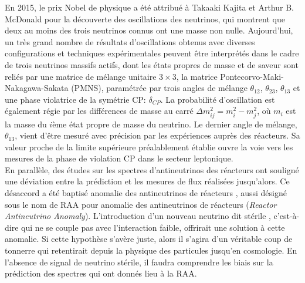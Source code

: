 En 2015, le prix Nobel de physique a été attribué à Takaaki Kajita et Arthur B. McDonald pour la découverte des oscillations des neutrinos, qui montrent que deux au moins des trois neutrinos connus ont une masse non nulle. Aujourd'hui, un très grand nombre de résultats d'oscillations obtenus avec diverses configurations et techniques expérimentales peuvent être interprétés dans le cadre de trois neutrinos massifs actifs, dont les états propres de masse et de saveur sont reliés par une matrice de mélange unitaire $3\times 3$, la matrice Pontecorvo-Maki-Nakagawa-Sakata (PMNS), paramétrée par trois angles de mélange $\theta_{12}$, $\theta_{23}$, $\theta_{13}$ et une phase violatrice de la symétrie CP: $\delta_{CP}$. La probabilité d'oscillation est également régie par les différences de masse au carré $\Delta m^2_{ij} = m^2_i - m^2_j$, où $m_i$ est la masse du $i$ème état propre de masse du neutrino. Le dernier angle de mélange, $\theta_{13}$, vient d'être mesuré avec précision par les expériences auprès des réacteurs. Sa valeur proche de la limite supérieure préalablement établie ouvre la voie vers les mesures de la phase de violation CP dans le secteur leptonique.\\


En parallèle, des études sur les spectres d'antineutrinos des réacteurs ont souligné une déviation entre la prédiction et les mesures de flux réalisées jusqu'alors. Ce désaccord a été baptisé \og anomalie des antineutrinos de réacteurs \fg{}, aussi désigné sous le nom de RAA pour anomalie des antineutrinos de réacteurs (\textit{Reactor Antineutrino Anomaly}). L'introduction d'un nouveau neutrino dit \og stérile \fg{}, c'est-à-dire qui ne se couple pas avec l'interaction faible,  offrirait une solution à cette anomalie. Si cette hypothèse s'avère juste, alors il s'agira d'un véritable coup de tonnerre qui retentirait depuis la physique des particules jusqu'en cosmologie. En l'absence de signal de neutrino stérile, il faudra comprendre les biais sur la prédiction des spectres qui ont donnés lieu à la RAA.\\

